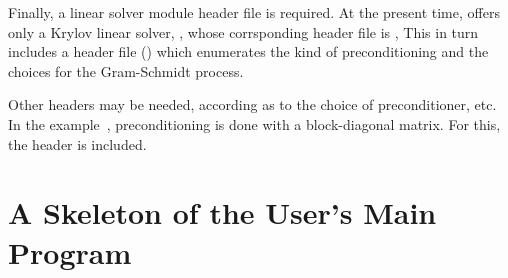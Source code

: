 Finally, a linear solver module header file is required. 
At the present time, {\kinsol} offers only a Krylov linear solver, {\kinspgmr},
whose corrsponding header file is , 
This in turn includes a header file ()
which enumerates the kind of preconditioning and the choices for the
Gram-Schmidt process.

Other headers may be needed, according as to the choice of
preconditioner, etc. In the  example~\cite{kin2.20_ex}, 
preconditioning is done with a block-diagonal matrix. For this, the header
 is included.

\section{A Skeleton of the User's Main Program}\label{s:skeleton_sol}

